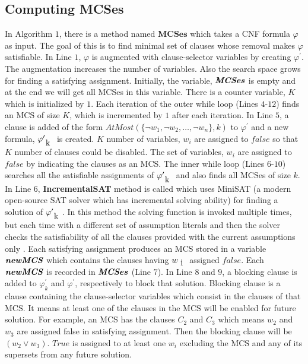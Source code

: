 \subsection{Computing MCSes}
In Algorithm $1$, there is a method named $\textbf{MCSes}$ which takes a CNF formula $\varphi$ as input. The goal of this is to find minimal set of clauses whose removal makes $\varphi$ satisfiable. In Line $1$, $\varphi$ is augmented with clause-selector variables by creating $\varphi^{\prime}$. The augmentation increases the number of variables. Also the search space grows for finding a satisfying assignment. Initially, the variable, $\textbf{\textit{MCSes}}$ is empty and  at the end we will get all MCSes in this variable. There is a counter variable, $K$ which is initialized by $1$.\newline
Each iteration of the outer while loop (Lines $4$-$12$) finds an MCS of size $K$, which is incremented by $1$ after each iteration. In Line $5$, a clause is added of the form $AtMost(\{\neg w_{1},\neg w_{2},\ldots,\neg w_{n}\},k)$ to $\varphi^{\prime}$ and a new formula, $\varphi^{\prime}_{\text k}$ is created. $K$ number of variables, $w_{i}$ are assigned to $false$ so that $K$ number of clauses could be disabled. The set of variables, $w_{i}$ are assigned to $false$ by indicating the clauses as an MCS.\newline
The inner while loop (Lines $6$-$10$) searches all the satisfiable assignments of $\varphi^{\prime}_{\text k}$ and also finds all MCSes of size $k$. In Line $6$, \textbf{IncrementalSAT} method is called which uses MiniSAT (a modern open-source SAT solver which has incremental solving ability) for finding a solution of $\varphi^{\prime}_{\text k}$. In this method the solving function is invoked multiple times, but each time with a different set of assumption literals and then the solver checks the satisfiability of all the clauses provided with the current assumptions only \cite{nadel}. Each satisfying assignment produces an MCS stored in a variable $\textbf{\textit{newMCS}}$ which contains the clauses having $w_{\text i}$ assigned $false$. Each $\textbf{\textit{newMCS}}$ is recorded in $\textbf{\textit{MCSes}}$ (Line $7$). In Line $8$ and $9$, a blocking clause is added to $\varphi^{\prime}_{k}$ and $\varphi^{\prime}$, respectively to block that solution. Blocking clause is a clause containing the clause-selector variables which consist in the clauses of that MCS. It means at least one of the clauses in the MCS will be enabled for future solution. For example, an MCS has the clauses $C_{2}$ and $C_{3}$ which means $w_{2}$ and $w_{3}$ are assigned false in satisfying assignment. Then the blocking clause will be $(w_{2}\vee w_{3})$. $True$ is assigned to at least one $w_{i}$ excluding the MCS and any of its supersets from any future solution.\newline
